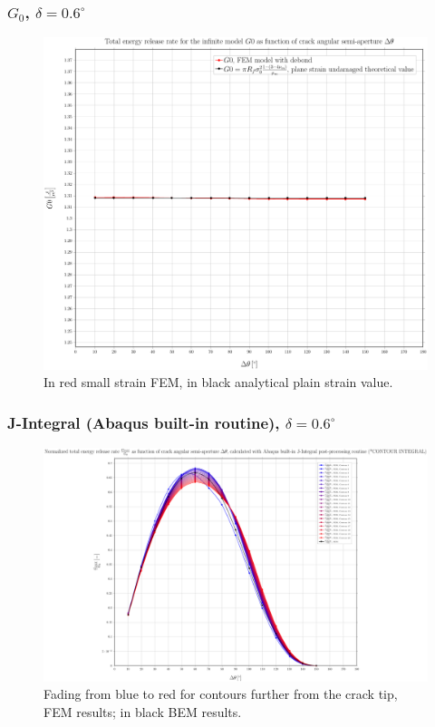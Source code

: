 \documentclass[first,firstsupp,lastsupp,handout,last,hyperref,table]{ETHclass}
\begin{document}
\begin{frame}
\frametitle{\small $G_{0}$, $\delta=0.6^{\circ}$}
\vspace{-0.5cm}
\centering
\captionsetup[figure]{font=scriptsize,labelfont=scriptsize}
\begin{figure}[!h]
\centering
\includegraphics[height=0.7\textheight]{2017-07-10_AbqRunSummary_SmallStrainD06_G0_Summary.pdf}
  \caption{\scriptsize In red small strain FEM, in black analytical plain strain value.}
  \label{fig:res1}
\end{figure}
\end{frame}

\begin{frame}
\frametitle{\small J-Integral (Abaqus built-in routine), $\delta=0.6^{\circ}$}
\vspace{-0.5cm}
\centering
\captionsetup[figure]{font=scriptsize,labelfont=scriptsize}
\begin{figure}[!h]
\centering
\includegraphics[height=0.7\textheight]{2017-07-10_AbqRunSummary_SmallStrainD06_J-INT_Summary.pdf}
  \caption{\scriptsize Fading from blue to red for contours further from the crack tip, FEM results; in black BEM results.}
  \label{fig:res1}
\end{figure}
\end{frame}
\end{document}
